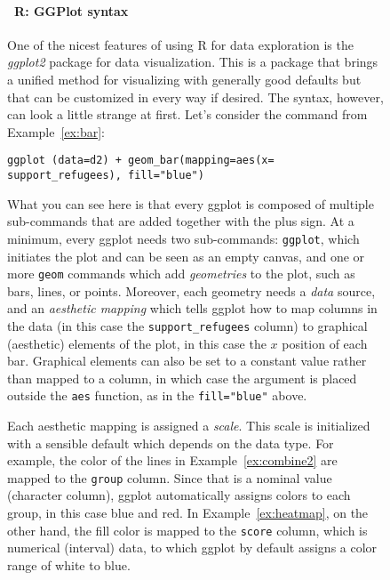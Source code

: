 %

\begin{figure}
  \vspace{-1em}
\begin{feature}
\footnotesize  \paragraph{\footnotesize\ R: GGPlot syntax}

One of the nicest features of using R for data exploration is the \emph{ggplot2} package for data visualization. This is a package that brings a unified method for visualizing with generally good defaults but that can be customized in every way if desired. The syntax, however, can look a little strange at first.
Let's consider the command from Example~\ref{ex:bar}:
\begin{verbatim}
ggplot (data=d2) + geom_bar(mapping=aes(x= support_refugees), fill="blue")
\end{verbatim}
What you can see here is that every ggplot is composed of multiple sub-commands that are added together with the plus sign.
At a minimum, every ggplot needs two sub-commands: \texttt{ggplot},
which initiates the plot and can be seen as an empty canvas,
and one or more \texttt{geom} commands which add \emph{geometries} to the plot,
such as bars, lines, or points.
Moreover, each geometry needs a \emph{data} source, and an \emph{aesthetic mapping}
which tells ggplot how to map columns in the data (in this case the \verb|support_refugees| column) to graphical (aesthetic) elements of the plot,
in this case the $x$ position of each bar.
Graphical elements can also be set to a constant value rather than mapped to a column,
in which case the argument is placed outside the \texttt{aes} function, as in the \verb|fill="blue"| above.

Each aesthetic mapping is assigned a \emph{scale}.
This scale is initialized with a sensible default which depends on the data type.
For example, the color of the lines in Example~\ref{ex:combine2} are mapped to the \verb|group| column.
Since that is a nominal value (character column), ggplot automatically assigns colors to each group,
in this case blue and red.
In Example~\ref{ex:heatmap}, on the other hand, the fill color is mapped to the \verb|score| column, which is numerical (interval) data, to which ggplot by default assigns a color range of white to blue.


\end{feature}
\end{figure}
